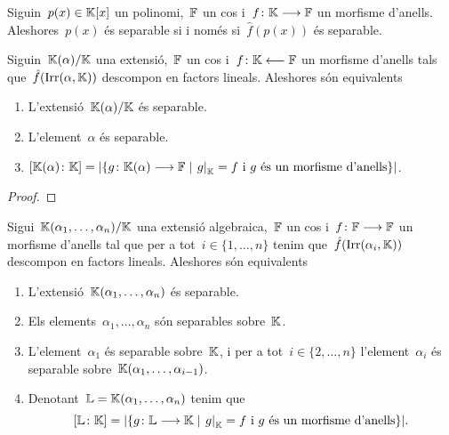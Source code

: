 \documentclass[../Apunts.tex]{subfiles}
\begin{document}
	\begin{lemma}
		\label{lema:un polinomi és separable si i només si ho és adaptant els coeficients}
		Siguin~\(p(x)\in\mathbb{K}[x]\) un polinomi,~\(\mathbb{F}\) un cos i~\(f\colon\mathbb{K}\longrightarrow\mathbb{F}\) un morfisme d'anells. Aleshores~\(p(x)\) és separable si i només si~\(\hat{f}(p(x))\) és separable.	
	\end{lemma}
	\begin{lemma}
		\label{lema:condicions pel nombre d'extensions de morfismes}
		Siguin~\(\mathbb{K}(\alpha)/\mathbb{K}\) una extensió,~\(\mathbb{F}\) un cos i~\(f\colon\mathbb{K}\longleftarrow\mathbb{F}\) un morfisme d'anells tals que~\(\hat{f}(\operatorname{Irr}(\alpha,\mathbb{K}))\) descompon en factors lineals. Aleshores són equivalents
		\begin{enumerate}
			\item\label{lema:condicions pel nombre d'extensions de morfismes:eq1} L'extensió~\(\mathbb{K}(\alpha)/\mathbb{K}\) és separable.
			\item\label{lema:condicions pel nombre d'extensions de morfismes:eq2} L'element~\(\alpha\) és separable.
			\item\label{lema:condicions pel nombre d'extensions de morfismes:eq3} \(\grauExtensio{\KK(\alpha)}{\KK}=\card{\{g\colon\KK(\alpha)\longrightarrow\FF\mid\left.g\right|_{\KK}=f\text{ i }g\text{ és un morfisme d'anells}\}}\).
		\end{enumerate}
		\begin{proof}
		\end{proof}
	\end{lemma}
	\begin{theorem}
		\label{thm:Teorema de separabilitat}
		Sigui~\(\mathbb{K}(\alpha_{1},\dots,\alpha_{n})/\mathbb{K}\) una extensió algebraica,~\(\mathbb{F}\) un cos i~\(f\colon\mathbb{F}\longrightarrow\mathbb{F}\) un morfisme d'anells tal que per a tot~\(i\in\{1,\dots,n\}\) tenim que~\(\hat{f}(\operatorname{Irr}(\alpha_{i},\mathbb{K}))\) descompon en factors lineals. Aleshores són equivalents
		\begin{enumerate}
			\item L'extensió~\(\mathbb{K}(\alpha_{1},\dots,\alpha_{n})\) és separable.
			\item Els elements~\(\alpha_{1},\dots,\alpha_{n}\) són separables sobre~\(\mathbb{K}\).
			\item L'element~\(\alpha_{1}\) és separable sobre~\(\mathbb{K}\), i per a tot~\(i\in\{2,\dots,n\}\) l'element~\(\alpha_{i}\) és separable sobre~\(\mathbb{K}(\alpha_{1},\dots,\alpha_{i-1})\).
				\item Denotant~\(\mathbb{L}=\mathbb{K}(\alpha_{1},\dots,\alpha_{n})\) tenim que
				\[\grauExtensio{\LL}{\KK}=\card{\{g\colon\LL\longrightarrow\KK\mid\left.g\right|_{\KK}=f\text{ i }g\text{ és un morfisme d'anells}\}}.\]
		\end{enumerate}
	\end{theorem}
\end{document}
